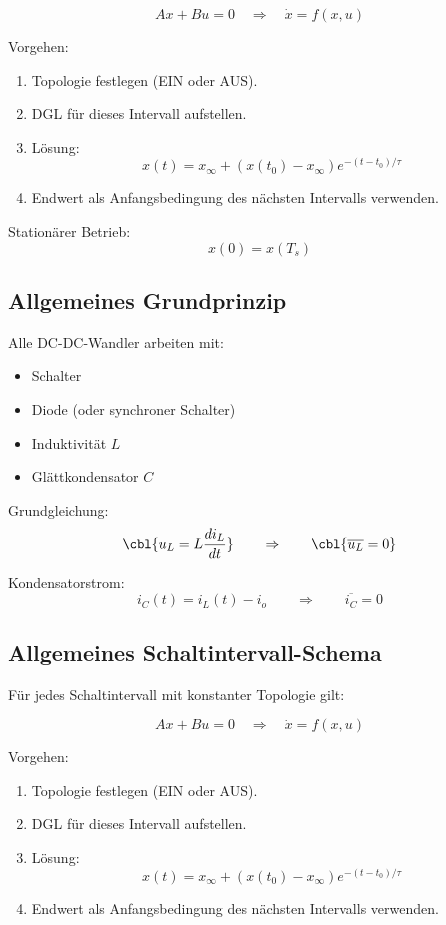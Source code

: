 \[
A x + B u = 0
\quad \Rightarrow \quad
\dot{x} = f(x,u)
\]

Vorgehen:

\begin{enumerate}
 \item Topologie festlegen (EIN oder AUS).
 \item DGL für dieses Intervall aufstellen.
 \item Lösung:
 \[
 x(t) = x_\infty + (x(t_0)-x_\infty)e^{-(t-t_0)/\tau}
 \]
 \item Endwert als Anfangsbedingung des nächsten Intervalls verwenden.
\end{enumerate}

Stationärer Betrieb:
\[
x(0) = x(T_s)
\]

\subsection{Allgemeines Grundprinzip}

Alle DC-DC-Wandler arbeiten mit:

\begin{itemize}
    \item Schalter
    \item Diode (oder synchroner Schalter)
    \item Induktivität $L$
    \item Glättkondensator $C$
\end{itemize}

Grundgleichung:
\[
\cbl{u_L = L \frac{di_L}{dt}}
\qquad\Rightarrow\qquad
\cbl{\overline{u_L} = 0}
\]

Kondensatorstrom:
\[
i_C(t) = i_L(t) - i_o
\qquad\Rightarrow\qquad
\overline{i_C} = 0
\]


\subsection{Allgemeines Schaltintervall-Schema}

Für jedes Schaltintervall mit konstanter Topologie gilt:

\[
A x + B u = 0
\quad \Rightarrow \quad
\dot{x} = f(x,u)
\]

Vorgehen:

\begin{enumerate}
 \item Topologie festlegen (EIN oder AUS).
 \item DGL für dieses Intervall aufstellen.
 \item Lösung:
 \[
 x(t) = x_\infty + (x(t_0)-x_\infty)e^{-(t-t_0)/\tau}
 \]
 \item Endwert als Anfangsbedingung des nächsten Intervalls verwenden.
\end{enumerate}

